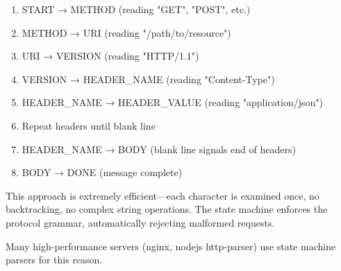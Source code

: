 \begin{enumerate}
    \item START → METHOD (reading "GET", "POST", etc.)
    \item METHOD → URI (reading "/path/to/resource")
    \item URI → VERSION (reading "HTTP/1.1")
    \item VERSION → HEADER\_NAME (reading "Content-Type")
    \item HEADER\_NAME → HEADER\_VALUE (reading "application/json")
    \item Repeat headers until blank line
    \item HEADER\_NAME → BODY (blank line signals end of headers)
    \item BODY → DONE (message complete)
\end{enumerate}

This approach is extremely efficient—each character is examined once, no backtracking, no complex string operations. The state machine enforces the protocol grammar, automatically rejecting malformed requests.

Many high-performance servers (nginx, nodejs http-parser) use state machine parsers for this reason.


